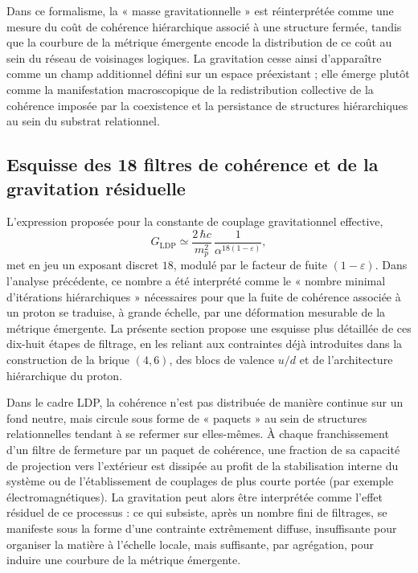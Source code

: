 \documentclass[11pt,a4paper]{article}
\begin{document}
Dans ce formalisme, la « masse gravitationnelle » est réinterprétée comme une mesure du coût de cohérence hiérarchique associé à une structure fermée, tandis que la courbure de la métrique émergente encode la distribution de ce coût au sein du réseau de voisinages logiques. La gravitation cesse ainsi d’apparaître comme un champ additionnel défini sur un espace préexistant ; elle émerge plutôt comme la manifestation macroscopique de la redistribution collective de la cohérence imposée par la coexistence et la persistance de structures hiérarchiques au sein du substrat relationnel.

\subsection*{Esquisse des 18 filtres de cohérence et de la gravitation résiduelle}

L’expression proposée pour la constante de couplage gravitationnel effective,
\[
G_{\mathrm{LDP}} \simeq \frac{2\,\hbar c}{m_p^{2}}\,
\frac{1}{\alpha^{18\left(1-\varepsilon\right)}},
\]
met en jeu un exposant discret \(18\), modulé par le facteur de fuite \((1-\varepsilon)\). Dans l’analyse précédente, ce nombre a été interprété comme le « nombre minimal d’itérations hiérarchiques » nécessaires pour que la fuite de cohérence associée à un proton se traduise, à grande échelle, par une déformation mesurable de la métrique émergente. La présente section propose une esquisse plus détaillée de ces dix-huit étapes de filtrage, en les reliant aux contraintes déjà introduites dans la construction de la brique \((4,6)\), des blocs de valence \(u/d\) et de l’architecture hiérarchique du proton.

Dans le cadre LDP, la cohérence n’est pas distribuée de manière continue sur un fond neutre, mais circule sous forme de « paquets » au sein de structures relationnelles tendant à se refermer sur elles-mêmes. À chaque franchissement d’un filtre de fermeture par un paquet de cohérence, une fraction de sa capacité de projection vers l’extérieur est dissipée au profit de la stabilisation interne du système ou de l’établissement de couplages de plus courte portée (par exemple électromagnétiques). La gravitation peut alors être interprétée comme l’effet résiduel de ce processus : ce qui subsiste, après un nombre fini de filtrages, se manifeste sous la forme d’une contrainte extrêmement diffuse, insuffisante pour organiser la matière à l’échelle locale, mais suffisante, par agrégation, pour induire une courbure de la métrique émergente.
\end{document}
